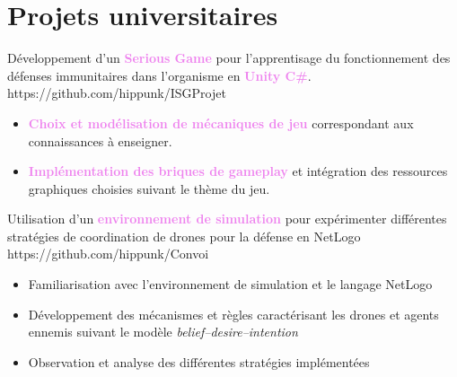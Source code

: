 \documentclass[11pt,a4paper]{moderncv}
\begin{document}

\section{Projets universitaires}

{Développement d'un \textcolor{violet}{\textbf{Serious Game}} pour l'apprentisage du fonctionnement des défenses immunitaires dans l'organisme en \textcolor{violet}{\textbf{Unity C\#}}.} { https://github.com/hippunk/ISGProjet}{}{}{
\begin{itemize}
\item \textcolor{violet}{\textbf{Choix et modélisation de mécaniques de jeu}} correspondant aux connaissances à enseigner.
\item \textcolor{violet}{\textbf{Implémentation des briques de gameplay}} et intégration des ressources graphiques choisies suivant le thème du jeu.
\end{itemize}
}
{Utilisation d'un \textcolor{violet}{\textbf{environnement de simulation}} pour expérimenter différentes stratégies de coordination de drones pour la défense en NetLogo }{ https://github.com/hippunk/Convoi}{}{}{
\begin{itemize}
\item Familiarisation avec l'environnement de simulation et le langage NetLogo
\item Développement des mécanismes et règles caractérisant les drones et agents ennemis suivant le modèle \textit{belief–desire–intention}
\item Observation et analyse des différentes stratégies implémentées
\end{itemize}}

\end{document}
